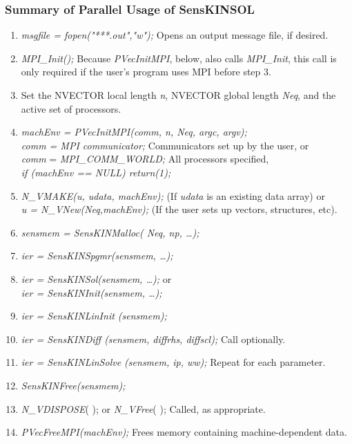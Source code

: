 \documentclass[11pt]{article}
\begin{document}
\subsubsection{Summary of Parallel Usage of SensKINSOL}
\label{parallel-usage}

\begin{enumerate}

\item {\em msgfile = fopen("***.out","w");} Opens an output message
file, if desired.

\item  {\em MPI\_Init();} Because {\em PVecInitMPI}, below, also calls
{\em MPI\_Init}, this call is only required if the user's program uses
MPI before step 3.

\item Set the NVECTOR local length {\em n}, NVECTOR global length {\em
Neq}, and the active set of processors.

\item
{\em machEnv = PVecInitMPI(comm, n, Neq, argc, argv);} \\
{\em comm = MPI communicator;} Communicators set up by the user, or \\
{\em comm} = {\em MPI\_COMM\_WORLD;} All processors specified, \\ 
{\em if (machEnv == NULL) return(1);}


\item {\em N\_VMAKE(u, udata, machEnv);} (If {\em udata} is an
existing data array) or \\ {\em u = N\_VNew(Neq,machEnv);} (If the
user sets up vectors, structures, etc).


\item  {\em sensmem = SensKINMalloc( Neq, np, \ldots);}


\item {\em ier = SensKINSpgmr(sensmem, \ldots);}

\item {\em ier = SensKINSol(sensmem, \ldots);} or \\
      {\em ier = SensKINInit(sensmem, \ldots);}


\item {\em ier = SensKINLinInit (sensmem);}

\item {\em ier = SensKINDiff (sensmem, diffrhs, diffscl);} Call optionally.

\item {\em ier = SensKINLinSolve (sensmem, ip, ww);} Repeat for each
parameter.

\item {\em SensKINFree(sensmem);}
\item {\em N\_VDISPOSE}(  ); or {\em N\_VFree}( ); Called, as appropriate.

\item {\em PVecFreeMPI(machEnv);} Frees memory containing
machine-dependent data.
\end{enumerate}
\end{document}
